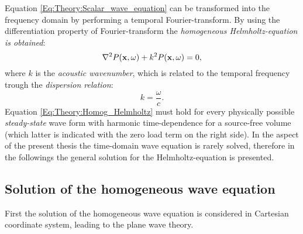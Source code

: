 \vspace{3mm}
%
Equation \eqref{Eq:Theory:Scalar_wave_equation} can be transformed into the frequency domain by performing a temporal Fourier-transform. By using the differentiation property of Fourier-transform the \emph{homogeneous Helmholtz-equation is obtained}:
\begin{equation}
\nabla^2 P(\mathbf{x},\omega) + k^2 P(\mathbf{x},\omega) = 0,
\label{Eq:Theory:Homog_Helmholtz}
\end{equation}
where $k$ is the \emph{acoustic wavenumber}, which is related to the temporal frequency trough the \emph{dispersion relation}:
\begin{equation}
k = \frac{\omega}{c}.
\end{equation}
%
Equation \eqref{Eq:Theory:Homog_Helmholtz} must hold for every physically possible \emph{steady-state} wave form with harmonic time-dependence for a source-free volume (which latter is indicated with the zero load term on the right side). In the aspect of the present thesis the time-domain wave equation is rarely solved, therefore in the followings the general solution for the Helmholtz-equation is presented.

\subsection{Solution of the homogeneous wave equation}

First the solution of the homogeneous wave equation is considered in Cartesian coordinate system, leading to the plane wave theory.

